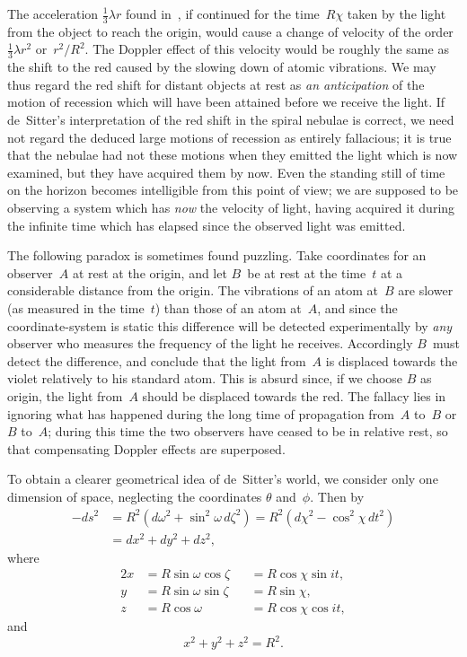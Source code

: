 \documentclass[12pt]{book}
\begin{document}
The acceleration $\frac{1}{3}\lambda r$ found in~, if continued for the time~$R\chi$ taken
by the light from the object to reach the origin, would cause a change of
velocity of the order $\frac{1}{3}\lambda r^{2}$ or~$r^{2}/R^{2}$. The Doppler effect of this velocity would
be roughly the same as the shift to the red caused by the slowing down of
atomic vibrations. We may thus regard the red shift for distant objects at
rest as \emph{an anticipation} of the motion of recession which will have been attained
before we receive the light. If de~Sitter's interpretation of the red shift in
the spiral nebulae is correct, we need not regard the deduced large motions
of recession as entirely fallacious; it is true that the nebulae had not these
motions when they emitted the light which is now examined, but they have
acquired them by now. Even the standing still of time on the horizon becomes
intelligible from this point of view; we are supposed to be observing a system
which has \emph{now} the velocity of light, having acquired it during the infinite
time which has elapsed since the observed light was emitted.

The following paradox is sometimes found puzzling. Take coordinates for
an observer~$A$ at rest at the origin, and let $B$~be at rest at the time~$t$ at a
considerable distance from the origin. The vibrations of an atom at~$B$ are
slower (as measured in the time~$t$) than those of an atom at~$A$, and since the
coordinate-system is static this difference will be detected experimentally by
\emph{any} observer who measures the frequency of the light he receives. Accordingly
$B$~must detect the difference, and conclude that the light from~$A$ is displaced
towards the violet relatively to his standard atom. This is absurd since, if we
choose $B$ as origin, the light from~$A$ should be displaced towards the red. The
fallacy lies in ignoring what has happened during the long time of propagation
from~$A$ to~$B$ or $B$ to~$A$; during this time the two observers have ceased
to be in relative rest, so that compensating Doppler effects are superposed.

To obtain a clearer geometrical idea of de~Sitter's world, we consider only
one dimension of space, neglecting the coordinates $\theta$ and~$\phi$. Then by~
\begin{align*}
  -ds^{2} &= R^{2} (d\omega^{2} + \sin^{2}\omega\, d\zeta^{2})
  = R^{2} (d\chi^{2} - \cos^{2}\chi\, dt^{2}) \\
  &= dx^{2} + dy^{2} + dz^{2},
\end{align*}
where
\begin{alignat*}{2}
  x &= R\sin\omega \cos\zeta &&= R\cos\chi \sin it, \\
  y &= R\sin\omega \sin\zeta &&= R\sin\chi, \\
  z &= R\cos\omega &&= R\cos\chi \cos it,
\end{alignat*}
and
\[
x^{2} + y^{2} + z^{2} = R^{2}.
\]
\end{document}
